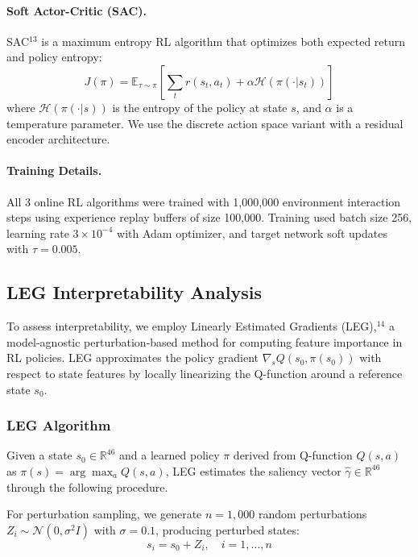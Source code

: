 \paragraph{Soft Actor-Critic (SAC).}
SAC$^{13}$ is a maximum entropy RL algorithm that optimizes both expected return and policy entropy:
\begin{equation}
J(\pi) = \mathbb{E}_{\tau \sim \pi}\left[\sum_t r(s_t, a_t) + \alpha \mathcal{H}(\pi(\cdot|s_t))\right]
\end{equation}
where $\mathcal{H}(\pi(\cdot|s))$ is the entropy of the policy at state $s$, and $\alpha$ is a temperature parameter. We use the discrete action space variant with a residual encoder architecture.

\paragraph{Training Details.}
All 3 online RL algorithms were trained with 1,000,000 environment interaction steps using experience replay buffers of size 100,000. Training used batch size 256, learning rate $3 \times 10^{-4}$ with Adam optimizer, and target network soft updates with $\tau = 0.005$.

\subsection{LEG Interpretability Analysis}\label{sec:methods:leg}

To assess interpretability, we employ Linearly Estimated Gradients (LEG),$^{14}$ a model-agnostic perturbation-based method for computing feature importance in RL policies. LEG approximates the policy gradient $\nabla_s Q(s_0, \pi(s_0))$ with respect to state features by locally linearizing the Q-function around a reference state $s_0$.

\subsubsection{LEG Algorithm}

Given a state $s_0 \in \mathbb{R}^{46}$ and a learned policy $\pi$ derived from Q-function $Q(s,a)$ as $\pi(s) = \arg\max_a Q(s,a)$, LEG estimates the saliency vector $\hat{\gamma} \in \mathbb{R}^{46}$ through the following procedure.

For perturbation sampling, we generate $n = 1{,}000$ random perturbations $Z_i \sim \mathcal{N}(0, \sigma^2 I)$ with $\sigma = 0.1$, producing perturbed states:
\begin{equation}
s_i = s_0 + Z_i, \quad i = 1, \ldots, n
\end{equation}

